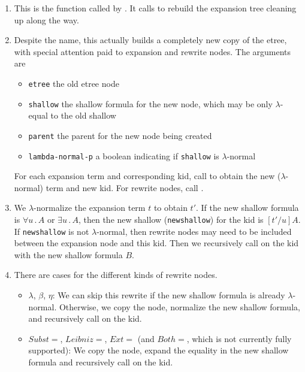 \begin{enumerate}
\item {\bf{}}  This is the function called by .
It calls  to rebuild the expansion tree cleaning up along the way.

\item {\bf{}}  Despite the name, this actually
builds a completely new copy of the etree, with special attention paid to
expansion and rewrite nodes.
The arguments are
\begin{itemize}
\item \verb+etree+ the old etree node
\item \verb+shallow+ the shallow formula for the new node, which may be only $\lambda$-equal to the old shallow
\item \verb+parent+ the parent for the new node being created
\item \verb+lambda-normal-p+ a boolean indicating if \verb+shallow+ is $\lambda$-normal
\end{itemize}
For each expansion term and corresponding kid,
call  to obtain the new
($\lambda$-normal) term and new kid.
For rewrite nodes, call .

\item {\bf {}}  We $\lambda$-normalize
the expansion term $t$ to obtain $t'$.  If the new shallow formula
is $\forall u\, . \, A$ or $\exists u\, . \, A$, then the new shallow (\verb+newshallow+)
for the kid is $[t'/u] A$.  If \verb+newshallow+ is
not $\lambda$-normal, then rewrite nodes may need to be included between
the expansion node and this kid.  Then we recursively call 
on the kid with the new shallow formula $B$.

\item {\bf {}}
There are cases for the different
kinds of rewrite nodes.
\begin{itemize}
\item $\lambda$, $\beta$, $\eta$:  We can skip this rewrite if the new shallow
formula is already $\lambda$-normal.  
Otherwise, we copy the node, normalize the new shallow formula, and
recursively call  on the kid.
\item $Subst=$, $Leibniz=$, $Ext=$ (and $Both=$, which is not currently fully supported):
We copy the node, expand the equality in the new shallow formula
and recursively call  on the kid.


\end{itemize}
\end{enumerate}

